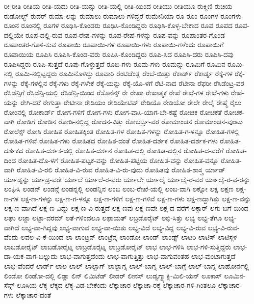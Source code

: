 {ರೀ
ರೀತಿ
ರೀತಿಯ
ರೀತಿ-ಯದು
ರೀತಿ-ಯನ್ನು
ರೀತಿ-ಯಲ್ಲಿ
ರೀತಿ-ಯಿಂದ
ರೀತಿಯು
ರೀತಿಯೂ
ರುಕ್ಮಿಣಿ
ರುಚಿಯ
ರುಡೋಲ್ಭ್
ರುದರ್
ರುಮಾ-ಲನ್ನು
ರುಮಾಲು
ರುಮಾಲು-ಗಳಿದ್ದರೆ
ರುಮೇನಿಯಾ
ರೂ
ರೂಂ
ರೂಂಗಳ
ರೂಂಗಳು
ರೂಂನ
ರೂಂನಲ್ಲಿ
ರೂಗಳ
ರೂಢಿಸಿ-ಕೊಂಡರು
ರೂಢಿಸಿ-ಕೊಂಡಿದ್ದರು
ರೂಢಿಸಿ-ಕೊಳ್ಳ-ಬೇಕಾದ
ರೂಪ
ರೂಪದ
ರೂಪ-ದಲ್ಲಿಯೇ
ರೂಪ-ದಲ್ಲಿ-ರುವ
ರೂಪ-ರೇಷ-ಗಳನ್ನು
ರೂಪ-ರೇಷೆ-ಗಳನ್ನು
ರೂಪ-ವನ್ನು
ರೂಪಾಂತರ-ಗೊಂಡ
ರೂಪಾಂತರ-ಗೊಳಿ-ಸುವ
ರೂಪಾಯಿ
ರೂಪಾಯಿ-ಗಳ
ರೂಪಾಯಿ-ಗಳು
ರೂಪಾಯಿ-ಗಳೆಂದು
ರೂಪಾಯಿಗೆ
ರೂಪಾಯಿಯ
ರೂಪಿಸಿ
ರೂಪಿಸಿ-ಕೊಂಡ-ವರು
ರೂಪಿಸಿ-ಕೊಂಡಿದ್ದರು
ರೂಪಿ-ಸಿದ
ರೂಪಿಸಿ-ದರು
ರೂಪಿಸಿ-ದವು
ರೂಪಿಸಿದ್ದರು
ರೂಪಿ-ಸುತ್ತದೆ
ರೂಪು-ಗೊಳ್ಳುತ್ತದೆ
ರೂಬಿ-ಗಳು
ರೂಮ-ಗಳು
ರೂಮನ್ನು
ರೂಮಿಗೆ
ರೂಮಿನ
ರೂಮಿ-ನಲ್ಲಿ
ರೂಮಿ-ನಲ್ಲಿಟ್ಟದ್ದರು
ರೂಮಿನೊಳಿದ್ದು
ರೂವಾರಿ
ರೆಂಟಿಚೆಂತ್ಲ
ರೆಂಬೆ-ಯಿತ್ತು
ರೆಕಾರ್ಡ್
ರೆಕಾರ್ಡ್ನ
ರೆಕ್ಕೆ-ಗಳ
ರೆಕ್ಕೆ-ಗಳನ್ನು
ರೆಕ್ಕೆ-ಗಳಲ್ಲಿನ
ರೆಕ್ಕೆ-ಗಳು
ರೆಕ್ಕೆ-ಗಳೇಕೆ
ರೆಕ್ಕೆ-ಯನ್ನು
ರೆಕ್ಕೆ-ಯೊ-ಳಗೆ
ರೆಟಿ-ನಾದ
ರೆಟೀನಾ
ರೆಫರೀ
ರೆಸಿಡೆಂಟ್ರ-ವರ
ರೆಸಿಡೆನ್ಸಿಗೆ
ರೆಸಿಡೆನ್ಸಿ-ಯಲ್ಲಿ
ರೆಸಿಡೆನ್ಸಿ-ಯಿಂದ
ರೆಸೊನೆನ್ಸ್
ರೇ
ರೇಖಾ
ರೇಖಾತ್ಮಕ
ರೇಖೆ
ರೇಖೆ-ಗಳ
ರೇಖೆ-ಗಳು
ರೇಖೆ-ಯನ್ನು
ರೇಗಿ-ದರೆ
ರೇಗುತ್ತಾ
ರೇಟೀನಾ
ರೇಡಿಯಂ
ರೇಡಿಯೇಟಿವ್
ರೇಡಿಯೊ
ರೇಡಿಯೋ
ರೇಲೇ
ರೇಲೈ
ರೇಷ್ಮೆ
ರೈಲು
ರೋಂನಲ್ಲಿ
ರೋಕಾರ್ಡ್
ರೋಗ-ಗಳಿಗೆ
ರೋಗ-ಗಳು
ರೋಗ-ವಾಸಿ-ಯಾಗ-ಬೇ-ಕಷ್ಟೆ
ರೋಚಕ
ರೋಚಕತೆ
ರೋಚಕ-ವಾಗಿ
ರೋಡಿಗೆ
ರೋಡಿನ
ರೋಡಿ-ನಲ್ಲಿದ್ದ
ರೋದನ-ವಿತ್ತು
ರೋಬರ್ಟ್ರ-ವರ
ರೋಮಾಂಚನ
ರೋಮಾಂಚನ-ವುಂಟು
ರೋಲೆಕ್ಸ್
ರೋಸಿ
ರೋಹಿತ
ರೋಹಿತಕ್ಕಿಂತ
ರೋಹಿತ-ಗಳ
ರೋಹಿತ-ಗಳನ್ನು
ರೋಹಿತ-ಗ-ಳನ್ನೂ
ರೋಹಿತ-ಗಳಲ್ಲಿ
ರೋಹಿತ-ಗಳಿವೆ
ರೋಹಿತ-ಗಳು
ರೋಹಿತದ
ರೋಹಿತ-ದಂತೆ
ರೋಹಿತ-ದರ್ಶಕ
ರೋಹಿತ-ದರ್ಶಕ-ಗಳು
ರೋಹಿತ-ದರ್ಶಕದ
ರೋಹಿತ-ದರ್ಶಕ-ದಲ್ಲಿ
ರೋಹಿತ-ದರ್ಶನ
ರೋಹಿತ-ದಲ್ಲಿ
ರೋಹಿತ-ದಲ್ಲಿನ
ರೋಹಿತ-ದ-ವರೆಗೆ
ರೋಹಿತ-ದಿಂದ
ರೋಹಿತ-ದೊ-ಳಗೆ
ರೋಹಿತ-ಪಟ್ಟಕ-ವನ್ನು
ರೋಹಿತ-ಪಟ್ಟಿಯ
ರೋಹಿತ-ವನ್ನು
ರೋಹಿತ-ವನ್ನೂ
ರೋಹಿತ-ವಾಗಿ
ರೋಹಿತ-ವಿ-ರಲಿ
ರೋಹಿತ-ವಿ-ರುವ
ರೋಹಿತ-ವಿ-ರು-ವುದು
ರೋಹಿತವು
ರೋಹಿತ-ಶಾಸ್ತ್ರ
ರ್ಯಾಡ್
ರ್ಯಾಡ್ನನ್ನು
ರ್ಯಾಡ್ರ-ವರೇ
ರ್ಯಾಲೆ
ರ್ಯಾಲೆ-ರ-ವರು
ರ್ಯಾಲೇ
ರ್ಯಾಲೈ
ರ್ಯಾಲೈ-ರ-ವರ
ರ್ಯಾಲೈ-ರ-ವ-ರನ್ನು
ಲಂಘಿಸಿ
ಲಂಡನ್
ಲಂಡನ್ಗೆ
ಲಂಡನ್ನಲ್ಲಿ
ಲಂಡನ್ನಿನ
ಲಂಬ
ಲಂಬ-ರೇಖೆ-ಯಲ್ಲಿ
ಲಂಬ-ವಾಗಿ
ಲಕ್ನೋ
ಲಕ್ಷ
ಲಕ್ಷಣ
ಲಕ್ಷ-ಣ-ಗಳ
ಲಕ್ಷ-ಣ-ಗಳನ್ನು
ಲಕ್ಷ-ಣ-ಗ-ಳನ್ನೂ
ಲಕ್ಷ-ಣ-ಗಳಿಗೆ
ಲಕ್ಷ-ಣ-ಗಳಿವೆ
ಲಕ್ಷ-ಣ-ಗಳು
ಲಕ್ಷ-ಣದ್ದಾಗಿತ್ತು
ಲಕ್ಷ-ಣ-ವನ್ನು
ಲಕ್ಷ-ಣ-ವಾಗಿದೆ
ಲಕ್ಷ-ಣ-ವಿದ್ದು
ಲಕ್ಷ-ಣ-ವಿ-ರುತ್ತದೆ
ಲಕ್ಷ-ಣವು
ಲಕ್ಷ-ಣವೇ
ಲಕ್ಷ-ದ-ವರೆಗೆ
ಲಕ್ಸಾರ್
ಲಗು-ಬಗೆ-ಯಿಂದ
ಲಘು
ಲಜ್ಜಾ
ಲಟ್ಟಾ-ವರಮ್
ಲತೆ-ಗಳಿಂದಲೂ
ಲಫಾಯತ್
ಲಬ್ರಡೊರೈಟ್
ಲಭಿ-ಸಿತ್ತು
ಲಭ್ಯ
ಲಭ್ಯ-ತೆಗೂ
ಲಭ್ಯ-ವಾಗಿದೆ
ಲಭ್ಯ-ವಾ-ಗಿದ್ದವು
ಲಭ್ಯ-ವಾಗುವ
ಲಭ್ಯ-ವಾ-ಯಿತು
ಲಭ್ಯ-ವಿದೆ
ಲಭ್ಯ-ವಿದ್ದ
ಲಭ್ಯ-ವಿ-ರುವ
ಲಭ್ಯ-ವಿ-ರುವ-ವೆಂದು
ಲವಲ-ವಿ-ಕೆ-ಯಿಂದ
ಲಾ
ಲಾಂಟ್ರನ್
ಲಾಂಟ್ರೆನ್ನ
ಲಾಂಡೋ
ಲಾಂಡ್
ಲಾಂಡ್ಸ್
ಲಾಟರಿ
ಲಾಟಿಸ್
ಲಾಟಿಸ್ಗಳ
ಲಾಬಡೋರೈಟ್
ಲಾಬಡೋರೈಟ್ನ
ಲಾಬ್ರಡೊರೈಟ್ನ
ಲಾಬ್ರಡೋರೈಟ್
ಲಾಭ
ಲಾಭ-ಗಳಿಸಿ
ಲಾಭ-ಗಳಿ-ಸುತ್ತಿದ್ದರು
ಲಾಭ-ದಾ-ಯಕ-ವಾಗ-ಬಲ್ಲುದು
ಲಾಭ-ವಾಗುತ್ತದೆಂದು
ಲಾಭ-ವಾಗುತ್ತಿತ್ತು
ಲಾಭ-ವಾಗುವಂತಹ
ಲಾಭ-ವುಂಟಾಗುತ್ತದೆ
ಲಾಭ-ವೆಂದರೆ
ಲಾರ್ಡ್
ಲಾಲ
ಲಾಲ್
ಲಾಲ್ಬಾಗ್
ಲಾಲ್ಬಾಗ್ನ
ಲಾಲ್-ಬಾಗ್ನ
ಲಾಲ್-ಬಾಗ್ಗೆ
ಲಾಲ್-ಬಾಗ್ನ
ಲಾಹೋರ್ನಲ್ಲಿ
ಲಿಂಡೋ
ಲಿಂಡೋ-ದಲ್ಲಿ
ಲಿಡ್ಲಾ
ಲಿನ್
ಲಿಮಿಟೆಡ್
ಲೀಡರ್
ಲೀನಸ್
ಲುಡ್ವಗ್ಮ್ಯಾಕ್ಸಿ-ಮಿಲಿ-ಯನ್
ಲೂಕಾಸ್
ಲೂಮಿನ-ಸೆನ್ಸ್
ಲೂಸಿಯ
ಲೆಕ್ಕ
ಲೆಕ್ಕದ
ಲೆಕ್ಕ-ವಿಡ-ಬೇಕೆಂದು
ಲೆಕ್ಕಾಚಾರ
ಲೆಕ್ಕಾಚಾ-ರಕ್ಕೆ
ಲೆಕ್ಕಾಚಾರ-ಗಳಿ-ಗಿಂತಲೂ
ಲೆಕ್ಕಾಚಾರ-ಗಳು
ಲೆಕ್ಕಾಚಾರ-ದಂತೆ
}
